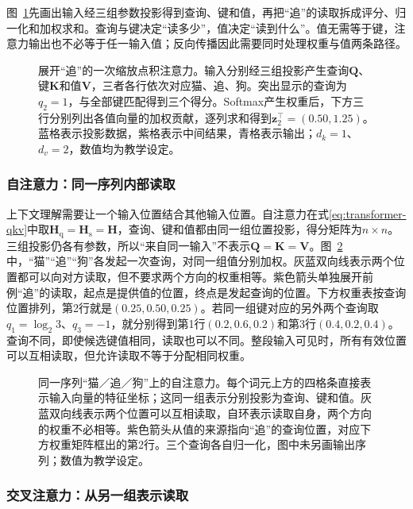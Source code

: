 图~\ref{fig:transformer-attention}先画出输入经三组参数投影得到查询、键和值，再把“追”的读取拆成评分、归一化和加权求和。查询与键决定“读多少”，值决定“读到什么”。值无需等于键，注意力输出也不必等于任一输入值；反向传播因此需要同时处理权重与值两条路径。

\begin{figure}[htbp]
  \centering
  
  \caption{展开“追”的一次缩放点积注意力。输入分别经三组投影产生查询$\bm Q$、键$\bm K$和值$\bm V$，三者各行依次对应猫、追、狗。突出显示的查询为$q_2=1$，与全部键匹配得到三个得分。Softmax产生权重后，下方三行分别列出各值向量的加权贡献，逐列求和得到$\bm z_2^{\top}=(0.50,1.25)$。蓝格表示投影数据，紫格表示中间结果，青格表示输出；$d_k=1$、$d_v=2$，数值均为教学设定。}
  \label{fig:transformer-attention}
\end{figure}
\FloatBarrier


\subsubsection{自注意力：同一序列内部读取}

上下文理解需要让一个输入位置结合其他输入位置。自注意力在式\eqref{eq:transformer-qkv}中取$\bm H_{\mathrm q}=\bm H_{\mathrm s}=\bm H$，查询、键和值都由同一组位置投影，得分矩阵为$n\times n$。三组投影仍各有参数，所以“来自同一输入”不表示$\bm Q=\bm K=\bm V$。图~\ref{fig:transformer-self-attention}中，“猫”“追”“狗”各发起一次查询，对同一组值分别加权。灰蓝双向线表示两个位置都可以向对方读取，但不要求两个方向的权重相等。紫色箭头单独展开前例“追”的读取，起点是提供值的位置，终点是发起查询的位置。下方权重表按查询位置排列，第2行就是$(0.25,0.50,0.25)$。若同一组键对应的另外两个查询取$q_1=\log_2 3$、$q_3=-1$，就分别得到第1行$(0.2,0.6,0.2)$和第3行$(0.4,0.2,0.4)$。查询不同，即使候选键值相同，读取也可以不同。整段输入可见时，所有有效位置可以互相读取，但允许读取不等于分配相同权重。

\begin{figure}[htbp]
  \centering
  
  \caption{同一序列“猫／追／狗”上的自注意力。每个词元上方的四格条直接表示输入向量的特征坐标；这同一组表示分别投影为查询、键和值。灰蓝双向线表示两个位置可以互相读取，自环表示读取自身，两个方向的权重不必相等。紫色箭头从值的来源指向“追”的查询位置，对应下方权重矩阵框出的第2行。三个查询各自归一化，图中未另画输出序列；数值为教学设定。}
  \label{fig:transformer-self-attention}
\end{figure}
\FloatBarrier

\subsubsection{交叉注意力：从另一组表示读取}

